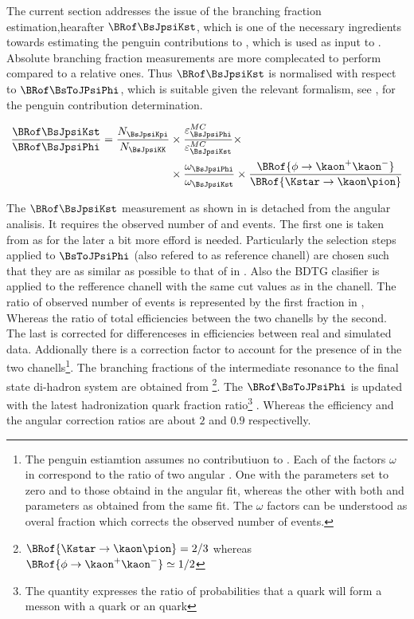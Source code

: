 
The current section addresses the issue of the \BsJpsiKst branching fraction estimation,hearafter $\BRof\BsJpsiKst$,
which is one of the necessary ingredients towards estimating the penguin contributions to \phis, which is used as 
input to . Absolute branching fraction measurements are 
more complecated to perform compared to a relative ones. Thus $\BRof\BsJpsiKst$ is normalised with respect to 
$\BRof\BsToJPsiPhi$, which is suitable given the relevant formalism, see , for the penguin
 contribution determination. 

\begin{align}
\frac{\BRof\BsJpsiKst}{\BRof\BsJpsiPhi} = \frac{N_{\BsJpsiKpi}}{N_{\BsJpsiKK}} &\times \frac{\varepsilon_{\BsJpsiPhi}^{MC}}{\varepsilon_{\BsJpsiKst}^{MC}} \times \nonumber \\
                                                                          &\times \frac{\omega_{\BsJpsiPhi}}{\omega_{\BsJpsiKst}} \times \frac{\BRof{\phi\to\kaon^+\kaon^-}}{\BRof{\Kstar\to\kaon\pion}} 
\label{norm_jpsiPhi}
\end{align}

The $\BRof\BsJpsiKst$ measurement as shown in  is detached from the angular analisis. It requires the observed number 
of \BsJpsiKst and \BsToJPsiPhi events. The first one is taken from  as for the later a bit more efford is needed.
Particularly the selection steps applied to $\BsToJPsiPhi$ (also refered to as reference chanell) are chosen such that they are as 
similar as possible to that of \BsJpsiKst in . Also the BDTG clasifier is applied to the refference chanell
with the same cut values as in the \BsJpsiKst chanell. The ratio of observed number of events is represented by the first fraction in ,
Whereas the ratio of total efficiencies between the two chanells by the second. The last is corrected for differenceses in efficiencies between real and 
simulated data. Addionally there is a correction factor to account for the presence of \swave in the two 
chanells\footnote{The penguin estiamtion assumes no \swave contributiuon to \BsJpsiKst. Each of the factors $\omega$ in  correspond
to the ratio of two angular \pdfs. One with the \swave parameters set to zero and \pwave to those obtaind in the angular fit,  whereas the other
with both \pwave and \swave parameters as obtained from the same fit. The $\omega$ factors can be understood as overal \swave fraction which
corrects the observed number of events. 
}. The branching fractions of the intermediate resonance to the final state di-hadron system are obtained from \cite{PDG}
\footnote{ $\BRof{\Kstar\to\kaon\pion} = 2/3$ whereas $\BRof{\phi\to\kaon^+\kaon^-}\simeq 1/2$}.
The $\BRof\BsToJPsiPhi$ \cite{SheldonKK} is updated with the latest hadronization \bquark quark fraction
ratio\footnote{The quantity \fdfs expresses the ratio of probabilities that a \bquark quark will form a messon with a \dquark quark or an \squark quark}
\cite{LHCb-CONF-2013-011}. Whereas the efficiency and the angular correction ratios are about $2$ and $0.9$ respectivelly. 

